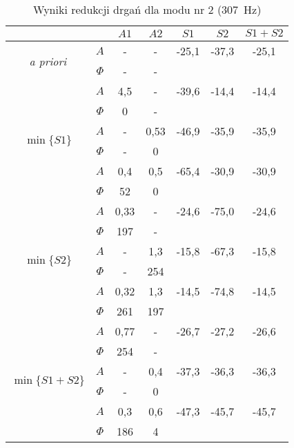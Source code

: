 \documentclass[polish,a4paper,11pt]{mwart}
\begin{document}
  \begin{table}[!tbh]
    \centering
    \caption{Wyniki redukcji drgań dla modu nr 2 (\SI{307}{\hertz})}
    \label{tab:red2}
    \begin{tabular}{|c|c|c|c|c|c|c|}
      \cline{3-7}
      \multicolumn{2}{c|}{}&$A1$&$A2$&$S1$&$S2$&$S1+S2$\\\hline
      \multirow{2}{*}{\textit{a priori}} & $A$ & - & - & -25,1 & -37,3 & -25,1\\\cline{2-7}
					 & $\Phi$ & - & - & \multicolumn{3}{c}{}\\\hline
      \multirow{6}{*}{$\min\{S1\}$}   &   $A$ & 4,5 & - & -39,6 & -14,4 & -14,4\\\cline{2-7}
				      &$\Phi$ & 0 & - & \multicolumn{3}{c}{}\\\cline{2-7}
				      &   $A$ & - & 0,53 & -46,9 & -35,9 & -35,9\\\cline{2-7}
				      &$\Phi$ & - & 0 & \multicolumn{3}{c}{}\\\cline{2-7}
				      &   $A$ & 0,4 & 0,5 & -65,4 & -30,9 & -30,9\\\cline{2-7}
				      &$\Phi$ & 52 & 0 & \multicolumn{3}{c}{}\\\hline
      \multirow{6}{*}{$\min\{S2\}$}   &   $A$ & 0,33 & - & -24,6 & -75,0 & -24,6\\\cline{2-7}
				      &$\Phi$ & 197 & - & \multicolumn{3}{c}{}\\\cline{2-7}
				      &   $A$ & - & 1,3 & -15,8 & -67,3 & -15,8\\\cline{2-7}
				      &$\Phi$ & - & 254 & \multicolumn{3}{c}{}\\\cline{2-7}
				      &   $A$ & 0,32 & 1,3 & -14,5 & -74,8 & -14,5\\\cline{2-7}
				      &$\Phi$ & 261 & 197 & \multicolumn{3}{c}{}\\\hline
      \multirow{6}{*}{$\min\{S1+S2\}$}&   $A$ & 0,77 & - & -26,7 & -27,2 & -26,6\\\cline{2-7}
				      &$\Phi$ & 254 & - & \multicolumn{3}{c}{}\\\cline{2-7}
				      &   $A$ & - & 0,4 & -37,3 & -36,3 & -36,3\\\cline{2-7}
				      &$\Phi$ & - & 0 & \multicolumn{3}{c}{}\\\cline{2-7}
				      &   $A$ & 0,3 & 0,6 & -47,3 & -45,7 & -45,7\\\cline{2-7}
				      &$\Phi$ & 186 & 4 & \multicolumn{3}{c}{}\\\cline{1-4}
    \end{tabular}
  \end{table}
\end{document}
